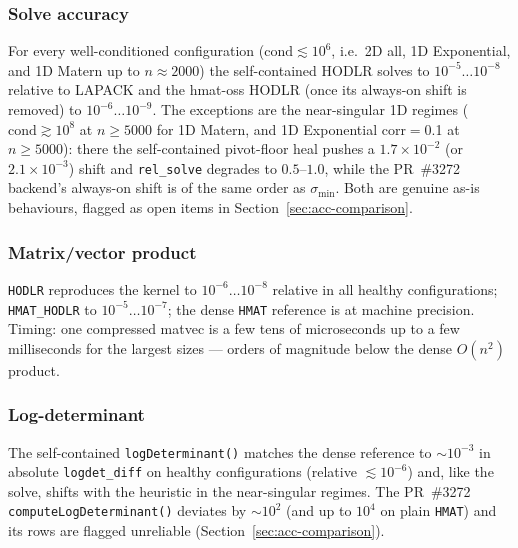 \documentclass[11pt,a4paper]{article}
\begin{document}
\subsubsection*{Solve accuracy}
For every well-conditioned configuration ($\mathrm{cond}\lesssim 10^{6}$,
i.e.\ 2D all, 1D Exponential, and 1D Matern up to $n\approx 2000$) the
self-contained HODLR solves to $10^{-5}\dots10^{-8}$ relative to LAPACK and
the hmat-oss HODLR (once its always-on shift is removed) to $10^{-6}\dots
10^{-9}$.  The exceptions are the near-singular 1D regimes
($\mathrm{cond}\gtrsim 10^{8}$ at $n\ge 5000$ for 1D Matern, and 1D
Exponential corr$=$0.1 at $n\ge 5000$): there the self-contained pivot-floor
heal pushes a $1.7\times10^{-2}$ (or $2.1\times10^{-3}$) shift and
\texttt{rel\_solve} degrades to $0.5$--$1.0$, while the PR~\#3272 backend's
always-on shift is of the same order as $\sigma_{\min}$.  Both are genuine
as-is behaviours, flagged as open items in
Section~\ref{sec:acc-comparison}.
\subsubsection*{Matrix/vector product}
\texttt{HODLR} reproduces the kernel to $10^{-6}\dots10^{-8}$ relative in all
healthy configurations; \texttt{HMAT\_HODLR} to $10^{-5}\dots10^{-7}$; the
dense \texttt{HMAT} reference is at machine precision.  Timing: one compressed
matvec is a few tens of microseconds up to a few milliseconds for the largest
sizes --- orders of magnitude below the dense $O(n^{2})$ product.
\subsubsection*{Log-determinant}
The self-contained \texttt{logDeterminant()} matches the dense reference to
$\sim 10^{-3}$ in absolute \texttt{logdet\_diff} on healthy configurations
(relative $\lesssim 10^{-6}$) and, like the solve, shifts with the heuristic
in the near-singular regimes.  The PR~\#3272
\texttt{computeLogDeterminant()} deviates by $\sim 10^{2}$ (and up to $10^{4}$
on plain \texttt{HMAT}) and its rows are flagged unreliable
(Section~\ref{sec:acc-comparison}).
\end{document}
